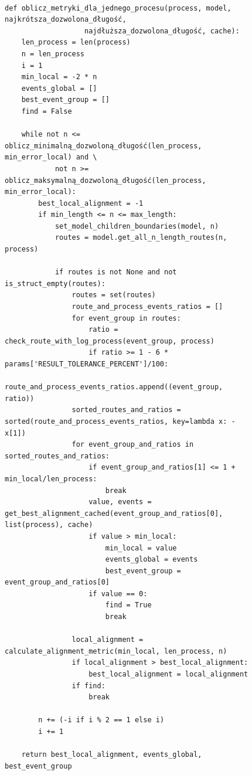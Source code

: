 \begin{figure}[!ht]
\lstset{caption=Obliczanie metryk dla jednego procesu, captionpos=b}
\lstset{label=src:best_result, frame=single}
\begin{lstlisting}

def oblicz_metryki_dla_jednego_procesu(process, model, najkrótsza_dozwolona_długość, 
				   najdłuższa_dozwolona_długość, cache):
    len_process = len(process)
    n = len_process
    i = 1
    min_local = -2 * n
    events_global = []
    best_event_group = []
    find = False

    while not n <= oblicz_minimalną_dozwoloną_długość(len_process, min_error_local) and \
            not n >= oblicz_maksymalną_dozwoloną_długość(len_process, min_error_local):
        best_local_alignment = -1
        if min_length <= n <= max_length:
            set_model_children_boundaries(model, n)
            routes = model.get_all_n_length_routes(n, process)

            if routes is not None and not is_struct_empty(routes):
                routes = set(routes)
                route_and_process_events_ratios = []
                for event_group in routes:
                    ratio = check_route_with_log_process(event_group, process)
                    if ratio >= 1 - 6 * params['RESULT_TOLERANCE_PERCENT']/100:
                        route_and_process_events_ratios.append((event_group, ratio))
                sorted_routes_and_ratios = sorted(route_and_process_events_ratios, key=lambda x: -x[1])
                for event_group_and_ratios in sorted_routes_and_ratios:
                    if event_group_and_ratios[1] <= 1 + min_local/len_process:
                        break
                    value, events = get_best_alignment_cached(event_group_and_ratios[0], list(process), cache)
                    if value > min_local:
                        min_local = value
                        events_global = events
                        best_event_group = event_group_and_ratios[0]
                    if value == 0:
                        find = True
                        break

                local_alignment = calculate_alignment_metric(min_local, len_process, n)
                if local_alignment > best_local_alignment:
                    best_local_alignment = local_alignment
                if find:
                    break

        n += (-i if i % 2 == 1 else i)
        i += 1

    return best_local_alignment, events_global, best_event_group
    

\end{lstlisting}
\end{figure}
